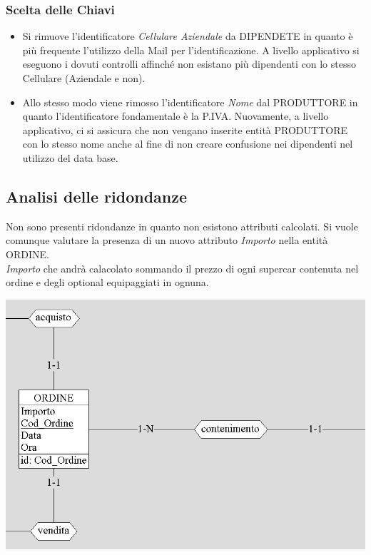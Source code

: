 \documentclass[12pt]{article}
\begin{document}
\subsubsection{Scelta delle Chiavi}

\begin{itemize}
    \item Si rimuove l'identificatore \textit{Cellulare Aziendale} da DIPENDETE
    in quanto è più frequente l'utilizzo della Mail per l'identificazione.  
    A livello applicativo si eseguono i dovuti controlli affinché non esistano
    più dipendenti con lo stesso Cellulare (Aziendale e non).
    \item Allo stesso modo viene rimosso l'identificatore \textit{Nome} dal
    PRODUTTORE in quanto l'identificatore fondamentale è la P.IVA. Nuovamente, a
    livello applicativo, ci si assicura che non vengano inserite entità
    PRODUTTORE con lo stesso nome anche al fine di non creare confusione nei
    dipendenti nel utilizzo del data base. 
\end{itemize}

\newpage

\subsection{Analisi delle ridondanze}

Non sono presenti ridondanze in quanto non esistono attributi calcolati. Si
vuole comunque valutare la presenza di un nuovo attributo \textit{Importo} nella entità ORDINE. \\
\textit{Importo} che andrà calacolato sommando il prezzo di
ogni supercar contenuta nel ordine e degli optional equipaggiati in ognuna.

\begin{center}
    \includegraphics[scale=0.80]{images/ordineImporto.png}
\end{center}
\end{document}
